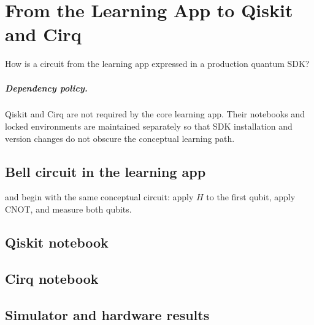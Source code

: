 \chapter{From the Learning App to Qiskit and Cirq}

\begin{openingquestion}
How is a circuit from the learning app expressed in a production quantum SDK?
\end{openingquestion}

\paragraph{Dependency policy.}
Qiskit and Cirq are not required by the core learning app. Their notebooks and
locked environments are maintained separately so that SDK installation and version
changes do not obscure the conceptual learning path.

\section{Bell circuit in the learning app}
 and  begin with the same conceptual
circuit: apply $H$ to the first qubit, apply CNOT, and measure both qubits.

\section{Qiskit notebook}

\section{Cirq notebook}

\section{Simulator and hardware results}
